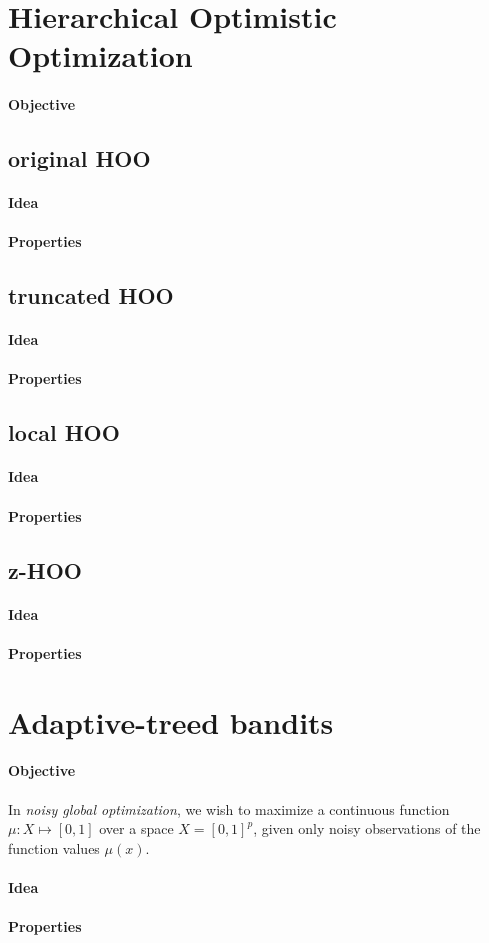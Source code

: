 \documentclass[a4paper,11pt,titlepage]{article}
\begin{document}
\section{Hierarchical Optimistic Optimization}
\paragraph{Objective}
\subsection{original HOO}
\paragraph{Idea}
\paragraph{Properties}
\subsection{truncated HOO}
\paragraph{Idea}
\paragraph{Properties}
\subsection{local HOO}
\paragraph{Idea}
\paragraph{Properties}
\subsection{z-HOO}
\paragraph{Idea}
\paragraph{Properties}

\section{Adaptive-treed bandits}
\paragraph{Objective}
In \textit{noisy global optimization}, we wish to maximize a continuous function $\mu :X \mapsto [0, 1]$ over a space $X = [0, 1]^p$, given only noisy observations of the function values $\mu(x)$.
\paragraph{Idea}
\paragraph{Properties}
\end{document}
